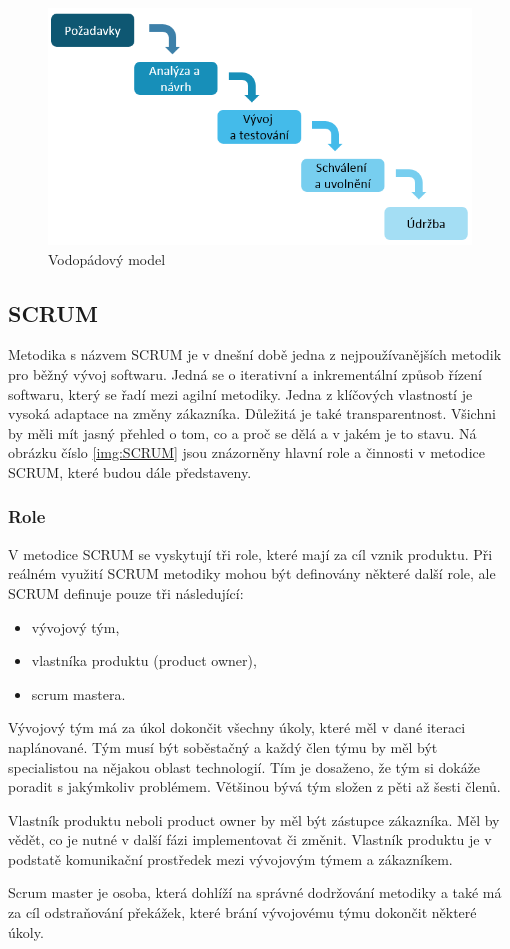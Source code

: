 \documentclass[czech,DP]{thesiskiv}
\begin{document}
\begin{figure}[!htb]
    \centering
    \includegraphics[width=\textwidth]{img/vodopad.png}
    \caption{Vodopádový model \cite{vodopad}}
    \label{img:vodopadimg}
\end{figure}
\FloatBarrier
\subsection{SCRUM}
Metodika s názvem SCRUM je v dnešní době jedna z nejpoužívanějších metodik pro běžný vývoj softwaru. Jedná se o iterativní a inkrementální způsob řízení softwaru, který se řadí mezi agilní metodiky. Jedna z klíčových vlastností je vysoká adaptace na změny zákazníka. Důležitá je také transparentnost. Všichni by měli mít jasný přehled o tom, co a proč se dělá a v jakém je to stavu. Ná obrázku číslo \ref{img:SCRUM} jsou znázorněny hlavní role a činnosti v metodice SCRUM, které budou dále představeny.
\subsubsection{Role}
V metodice SCRUM se vyskytují tři role, které mají za cíl vznik produktu. Při reálném využití SCRUM metodiky mohou být definovány některé další role, ale SCRUM definuje pouze tři následující:
\begin{itemize}
    \item vývojový tým,
    \item vlastníka produktu (product owner),
    \item scrum mastera.
\end{itemize}
Vývojový tým má za úkol dokončit všechny úkoly, které měl v dané iteraci naplánované. Tým musí být soběstačný a každý člen týmu by měl být specialistou na nějakou oblast technologií. Tím je dosaženo, že tým si dokáže poradit s jakýmkoliv problémem. Většinou bývá tým složen z pěti až šesti členů.
\par
Vlastník produktu neboli product owner by měl být zástupce zákazníka. Měl by vědět, co je nutné v další fázi implementovat či změnit. Vlastník produktu je v podstatě komunikační prostředek mezi vývojovým týmem a zákazníkem.
\par
Scrum master je osoba, která dohlíží na správné dodržování metodiky a také má za cíl odstraňování překážek, které brání vývojovému týmu dokončit některé úkoly.\cite{SCRUMImg}
\end{document}
